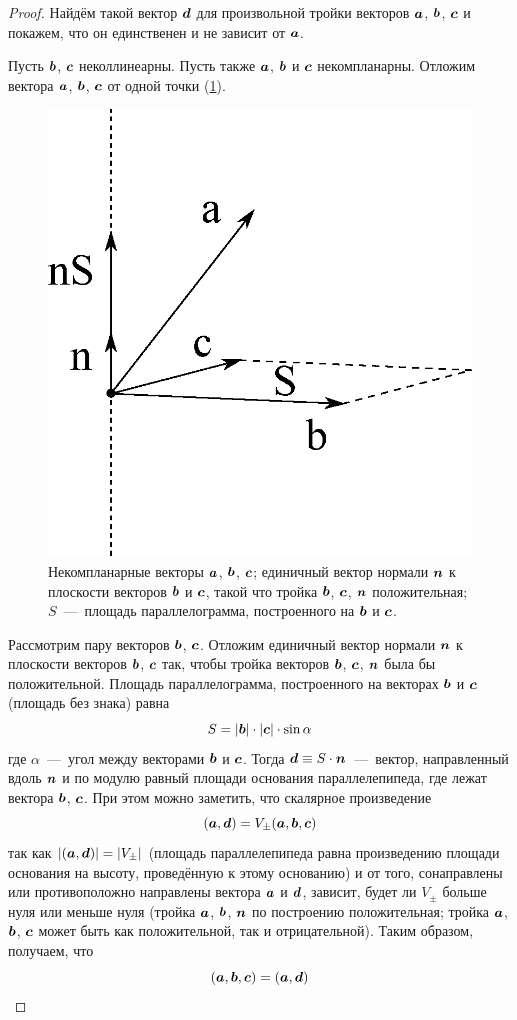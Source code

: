 \documentclass[a4paper,12pt]{article}
\begin{document}
  \begin{proof}
    Найдём такой вектор $\boldsymbol d$ для произвольной тройки векторов $\boldsymbol a$, $\boldsymbol b$, $\boldsymbol c$ и покажем, что он единственен и не зависит от $\boldsymbol a$.
    
    Пусть $\boldsymbol b$, $\boldsymbol c$ неколлинеарны.
    Пусть также $\boldsymbol a$, $\boldsymbol b$ и $\boldsymbol c$ некомпланарны.
    Отложим вектора $\boldsymbol a$, $\boldsymbol b$, $\boldsymbol c$ от одной точки (\ref{fig:triple-product}).
    
    \begin{figure}[h]
      \centering
      
      \includegraphics[width=0.5\columnwidth]{triple-product}
      
      \caption{Некомпланарные векторы $\boldsymbol a$, $\boldsymbol b$, $\boldsymbol c$; единичный вектор нормали $\boldsymbol n$ к плоскости векторов $\boldsymbol b$ и $\boldsymbol c$, такой что тройка $\boldsymbol b$, $\boldsymbol c$, $\boldsymbol n$ положительная; $S$~---~площадь параллелограмма, построенного на $\boldsymbol b$ и $\boldsymbol c$.}
      \label{fig:triple-product}
    \end{figure}
  
    Рассмотрим пару векторов $\boldsymbol b$, $\boldsymbol c$.
    Отложим единичный вектор нормали $\boldsymbol n$ к плоскости векторов $\boldsymbol b$, $\boldsymbol c$ так, чтобы тройка векторов $\boldsymbol b$, $\boldsymbol c$, $\boldsymbol n$ была бы положительной.
    Площадь параллелограмма, построенного на векторах $\boldsymbol b$ и $\boldsymbol c$ (площадь без знака) равна
    \[
      S = |\boldsymbol b| \cdot |\boldsymbol c| \cdot \sin\alpha
    \]
    где $\alpha$~---~угол между векторами $\boldsymbol b$ и $\boldsymbol c$.
    Тогда $\bds d \hm\equiv S \hm\cdot \bds n$~---~вектор, направленный вдоль $\boldsymbol n$ и по модулю равный площади основания параллелепипеда, где лежат вектора $\boldsymbol b$, $\boldsymbol c$.
    При этом можно заметить, что скалярное произведение
    \[
      (\boldsymbol a, \boldsymbol d) = V_{\pm}(\boldsymbol a, \boldsymbol b, \boldsymbol c)
    \]
    так как $|(\bds a, \bds d)| \hm= |V_{\pm}|$ (площадь параллелепипеда равна произведению площади основания на высоту, проведённую к этому основанию) и от того, сонаправлены или противоположно направлены вектора $\boldsymbol a$ и $
    \boldsymbol d$, зависит, будет ли $V_{\pm}$ больше нуля или меньше нуля (тройка $\boldsymbol a$, $\boldsymbol b$, $\boldsymbol n$ по построению положительная; тройка $\boldsymbol a$, $\boldsymbol b$, $\boldsymbol c$ может быть как положительной, так и отрицательной).
    Таким образом, получаем, что
    \[
      (\boldsymbol a, \boldsymbol b, \boldsymbol c) = (\boldsymbol a, \boldsymbol d)
    \]
    

\end{proof}
\end{document}
